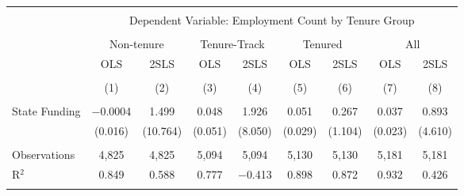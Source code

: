 
\begin{tabular}{@{\extracolsep{5pt}}lcccccccc} 
\\[-1.8ex]\hline 
\hline \\[-1.8ex] 
 & \multicolumn{8}{c}{Dependent Variable: Employment Count by Tenure Group} \\ 
\cline{2-9} 
\\[-1.8ex] & \multicolumn{2}{c}{Non-tenure} & \multicolumn{2}{c}{Tenure-Track} & \multicolumn{2}{c}{Tenured} & \multicolumn{2}{c}{All} \\ 
 & OLS & 2SLS & OLS & 2SLS & OLS & 2SLS & OLS & 2SLS \\ 
\\[-1.8ex] & (1) & (2) & (3) & (4) & (5) & (6) & (7) & (8)\\ 
\hline \\[-1.8ex] 
 State Funding & $-$0.0004 & 1.499 & 0.048 & 1.926 & 0.051 & 0.267 & 0.037 & 0.893 \\ 
  & (0.016) & (10.764) & (0.051) & (8.050) & (0.029) & (1.104) & (0.023) & (4.610) \\ 
 \hline \\[-1.8ex] 
Observations & 4,825 & 4,825 & 5,094 & 5,094 & 5,130 & 5,130 & 5,181 & 5,181 \\ 
R$^{2}$ & 0.849 & 0.588 & 0.777 & $-$0.413 & 0.898 & 0.872 & 0.932 & 0.426 \\ 
\hline 
\hline \\[-1.8ex] 
\end{tabular} 
